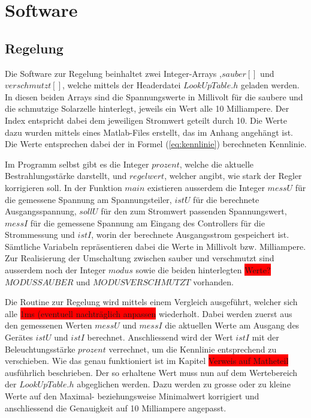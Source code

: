 \section{Software}

\subsection{Regelung}
Die Software zur Regelung beinhaltet zwei Integer-Arrays ,$sauber[]$ und $verschmutzt[]$, welche mittels der Headerdatei $LookUpTable.h$ geladen werden. In diesen beiden Arrays sind die Spannungswerte in Millivolt für die saubere und die schmutzige Solarzelle hinterlegt, jeweils ein Wert alle 10 Milliampere. Der Index entspricht dabei dem jeweiligen Stromwert geteilt durch 10. \newline
Die Werte dazu wurden mittels eines Matlab-Files erstellt, das im Anhang angehängt ist. Die Werte entsprechen dabei der in Formel (\ref{eq:kennlinie}) berechneten Kennlinie.

Im Programm selbst gibt es die Integer $prozent$, welche die aktuelle Bestrahlungsstärke darstellt, und $regelwert$, welcher angibt, wie stark der Regler korrigieren soll. \newline
In der Funktion $main$ existieren ausserdem die Integer $messU$ für die gemessene Spannung am Spannungsteiler, $istU$ für die berechnete Ausgangsspannung, $sollU$ für den zum Stromwert passenden Spannungswert, $messI$ für die gemessene Spannung am Eingang des Controllers für die Strommessung und $istI$, worin der berechnete Ausgangsstrom gespeichert ist. Sämtliche Variabeln repräsentieren dabei die Werte in Millivolt bzw. Milliampere. \newline
Zur Realisierung der Umschaltung zwischen sauber und verschmutzt sind ausserdem noch der Integer $modus$ sowie die beiden hinterlegten \colorbox{red}{Werte?} $MODUSSAUBER$ und $MODUSVERSCHMUTZT$ vorhanden.

Die Routine zur Regelung wird mittels einem Vergleich ausgeführt, welcher sich alle \colorbox{red}{1ms (eventuell nachträglich anpassen} wiederholt. Dabei werden zuerst aus den gemessenen Werten $messU$ und $messI$ die aktuellen Werte am Ausgang des Gerätes $istU$ und $istI$ berechnet. \newline
Anschliessend wird der Wert $istI$ mit der Beleuchtungsstärke $prozent$ verrechnet, um die Kennlinie entsprechend zu verschieben. Wie das genau funktioniert ist im Kapitel \colorbox{red}{Verweis auf Matheteil} ausführlich beschrieben. \newline
Der so erhaltene Wert muss nun auf dem Wertebereich der $LookUpTable.h$ abgeglichen werden. Dazu werden zu grosse oder zu kleine Werte auf den Maximal- beziehungsweise Minimalwert korrigiert und anschliessend die Genauigkeit auf 10 Milliampere angepasst.


